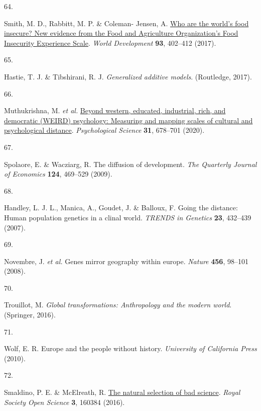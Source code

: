 \documentclass[
  man,floatsintext]{apa6}
\newlength{\cslhangindent}
\newlength{\csllabelwidth}
\newlength{\cslentryspacingunit} %
\newenvironment{CSLReferences}[2] %
 {%
  \setlength{\parindent}{0pt}
  \ifodd #1
  \let\oldpar\par
  \def\par{\hangindent=\cslhangindent\oldpar}
  \fi
  \setlength{\parskip}{#2\cslentryspacingunit}
 }%
 {}
\newcommand{\CSLLeftMargin}[1]{\parbox[t]{\csllabelwidth}{#1}}
\newcommand{\CSLRightInline}[1]{\parbox[t]{\linewidth - \csllabelwidth}{#1}\break}
\begin{document}
\begin{CSLReferences}{0}{0}
\leavevmode{}%
\CSLLeftMargin{64. }%
\CSLRightInline{Smith, M. D., Rabbitt, M. P. \& Coleman- Jensen, A. \href{https://doi.org/10.1016/j.worlddev.2017.01.006}{Who are the world's food insecure? New evidence from the {F}ood and {A}griculture {O}rganization's {F}ood {I}nsecurity {E}xperience {S}cale}. \emph{World Development} \textbf{93}, 402--412 (2017).}

\leavevmode{}%
\CSLLeftMargin{65. }%
\CSLRightInline{Hastie, T. J. \& Tibshirani, R. J. \emph{Generalized additive models}. (Routledge, 2017).}

\leavevmode{}%
\CSLLeftMargin{66. }%
\CSLRightInline{Muthukrishna, M. \emph{et al.} \href{https://doi.org/10.1177/0956797620916782}{Beyond western, educated, industrial, rich, and democratic (WEIRD) psychology: Measuring and mapping scales of cultural and psychological distance}. \emph{Psychological Science} \textbf{31}, 678--701 (2020).}

\leavevmode{}%
\CSLLeftMargin{67. }%
\CSLRightInline{Spolaore, E. \& Wacziarg, R. The diffusion of development. \emph{The Quarterly Journal of Economics} \textbf{124}, 469--529 (2009).}

\leavevmode{}%
\CSLLeftMargin{68. }%
\CSLRightInline{Handley, L. J. L., Manica, A., Goudet, J. \& Balloux, F. Going the distance: Human population genetics in a clinal world. \emph{TRENDS in Genetics} \textbf{23}, 432--439 (2007).}

\leavevmode{}%
\CSLLeftMargin{69. }%
\CSLRightInline{Novembre, J. \emph{et al.} Genes mirror geography within europe. \emph{Nature} \textbf{456}, 98--101 (2008).}

\leavevmode{}%
\CSLLeftMargin{70. }%
\CSLRightInline{Trouillot, M. \emph{Global transformations: Anthropology and the modern world}. (Springer, 2016).}

\leavevmode{}%
\CSLLeftMargin{71. }%
\CSLRightInline{Wolf, E. R. Europe and the people without history. \emph{University of California Press} (2010).}

\leavevmode{}%
\CSLLeftMargin{72. }%
\CSLRightInline{Smaldino, P. E. \& McElreath, R. \href{https://doi.org/10.1098/rsos.160384}{The natural selection of bad science}. \emph{Royal Society Open Science} \textbf{3}, 160384 (2016).}


\end{CSLReferences}
\end{document}
